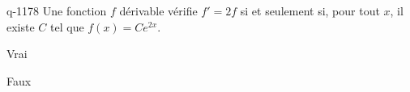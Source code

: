 \begin{truefalse}{q-1178}
Une fonction $f$ dérivable vérifie $f'=2f$ si et seulement si, pour tout $x$, il existe $C$ tel que $f(x)=Ce^{2x}$.
\item Vrai
\item* Faux
\end{truefalse}

